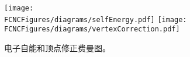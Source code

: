 
\begin{figure}[htb]
\centering
\texttt{[image: \\FCNCFigures/diagrams/selfEnergy.pdf]}
\texttt{[image: \\FCNCFigures/diagrams/vertexCorrection.pdf]}\\
\caption{ 电子自能和顶点修正费曼图。 }
\label{fig:QEDloop}
\end{figure}